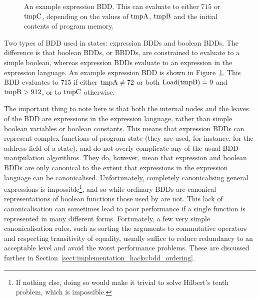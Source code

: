 \begin{figure}
  \begin{center}
  \end{center}
  \caption{An example expression BDD.  This can evaluate to either
    $715$ or $\mathrm{tmpC}$, depending on the values of $\mathrm{tmpA}$,
    $\mathrm{tmpB}$ and the initial contents of program memory.}
  \label{fig:derive:example_expr_bdd}
\end{figure}

Two types of BDD used in {\StateMachine} states: expression BDDs and
boolean BDDs.  The difference is that boolean BDDs, or BBDDs, are
constrained to evaluate to a simple boolean, whereas expression BDDs
evaluate to an expression in the expression language.  An example
expression BDD is shown in Figure~\ref{fig:derive:example_expr_bdd}.
This BDD evaluates to $715$ if either $\mathrm{tmpA} \not= 72$ or both
$\mathrm{Load}(\mathrm{tmpB}) = 9$ and $\mathrm{tmpB} > 912$, or to $\mathrm{tmpC}$
otherwise.  

The important thing to note here is that both the internal nodes and
the leaves of the BDD are expressions in the expression language,
rather than simple boolean variables or boolean constants.  This means
that expression BDDs can represent complex functions of program state
(they are used, for instance, for the address field of a 
state), and do not overly complicate any of the usual BDD manipulation
algorithms.  They do, however, mean that expression and boolean BDDs
are only canonical to the extent that expressions in the expression
language can be canonicalised.  Unfortunately, completely
canonicalising general expressions is impossible\footnote{If nothing
  else, doing so would make it trivial to solve Hilbert's tenth
  problem, which is impossible\cite{Davis1973}.}, and so while
ordinary BDDs are canonical representations of boolean functions those
used by {\technique} are not.  This lack of canonicalisation can
sometimes lead to poor performance if a single function is represented
in many different forms.  Fortunately, a few very simple
canonicalisation rules, such as sorting the arguments to commutative
operators and respecting transitivity of equality, usually suffice to
reduce redundancy to an acceptable level and avoid the worst
performance problems.  These are discussed further in
Section~\ref{sect:implementation_hacks:bdd_ordering}.

